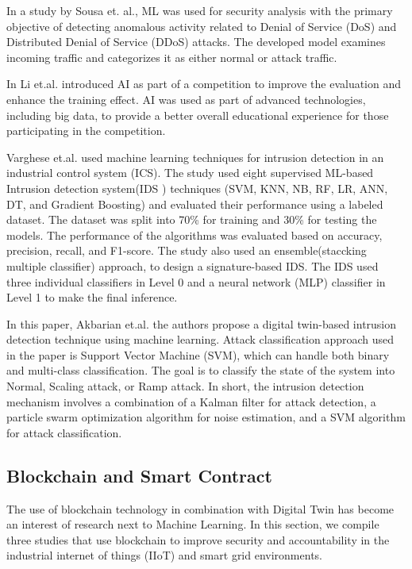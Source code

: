 In a study by Sousa et. al.\cite{sousaELEGANTSecurityCritical2021}, ML was used for security analysis with the primary objective of detecting anomalous activity related to Denial of Service (DoS) and Distributed Denial of Service (DDoS) attacks. The developed model examines incoming traffic and categorizes it as either normal or attack traffic.  

In \cite{jiaqiliSpaceSpiderHyper2022} Li et.al. introduced AI as part of a competition to improve the evaluation and enhance the training effect. AI was used as part of advanced technologies, including big data, to provide a better overall educational experience for those participating in the competition.  

Varghese et.al.\cite{vargheseDigitalTwinbasedIntrusion2022} used machine learning techniques for intrusion detection in an industrial control system (ICS). The study used eight supervised ML-based Intrusion detection system(IDS ) techniques (SVM, KNN, NB, RF, LR, ANN, DT, and Gradient Boosting) and evaluated their performance using a labeled dataset. The dataset was split into 70\% for training and 30\% for testing the models. The performance of the algorithms was evaluated based on accuracy, precision, recall, and F1-score. The study also used an ensemble(staccking multiple classifier) approach, to design a signature-based IDS. The IDS used three individual classifiers in Level 0 and a neural network (MLP) classifier in Level 1 to make the final inference.  

 In\cite{akbarianIntrusionDetectionDigital2020} this paper, Akbarian et.al. the authors propose a digital twin-based intrusion detection technique using machine learning. Attack classification approach used in the paper is Support Vector Machine (SVM), which can handle both binary and multi-class classification. The goal is to classify the state of the system into Normal, Scaling attack, or Ramp attack. In short, the intrusion detection mechanism involves a combination of a Kalman filter for attack detection, a particle swarm optimization algorithm for noise estimation, and a SVM algorithm for attack classification.  

 
\subsection{Blockchain and Smart Contract}
The use of blockchain technology in combination with Digital Twin has become an interest of research next to Machine Learning. In this section, we compile three studies that use blockchain to improve security and accountability in the industrial internet of things (IIoT) and smart grid environments.  

